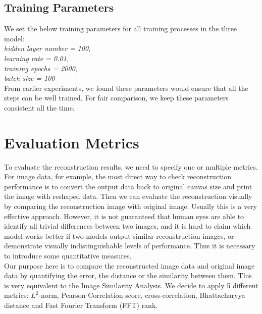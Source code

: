 \documentclass[12pt]{report} %
\begin{document}
\subsection{Training Parameters}
We set the below training parameters for all training processes in the three model:\\
\textit{hidden layer number = 100, \\
	learning rate = 0.01, \\
	training epochs = 2000, \\
	batch size = 100}\\
From earlier experiments, we found these parameters would ensure that all the steps can be well trained. For fair comparison, we keep these parameters consistent all the time.

\section{Evaluation Metrics}
To evaluate the reconstruction results, we need to specify one or multiple metrics. For image data, for example, the most direct way to check reconstruction performance is to convert the output data back to original canvas size and print the image with reshaped data. Then we can evaluate the reconstruction visually by comparing the reconstruction image with original image. Usually this is a very effective approach. However, it is not guaranteed that human eyes are able to identify all trivial differences between two images, and it is hard to claim which model works better if two models output similar reconstruction images, or demonstrate visually indistinguishable levels of performance. Thus it is necessary to introduce some quantitative measures. \\
Our purpose here is to compare the reconstructed image data and original image data by quantifying the error, the distance or the similarity between them. This is very equivalent to the Image Similarity Analysis\cite{PCC,CC,ISA}. We decide to apply 5 different metrics: $L^2$-norm, Pearson Correlation score, cross-correlation, Bhattacharyya distance and Fast Fourier Transform (FFT) rank.
\end{document}
